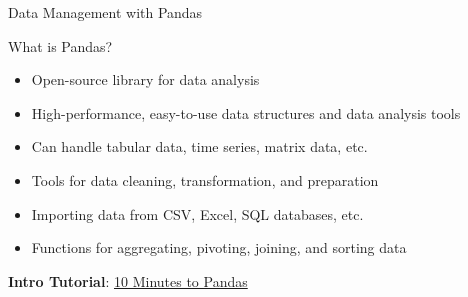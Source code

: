 \documentclass[ignorenonframetext,xcolor=x11names]{beamer}
\begin{document}
\begin{frame}{Data Management with Pandas}
\begin{block}{What is Pandas?}
\begin{itemize}
    \item Open-source library for data analysis
    \item High-performance, easy-to-use data structures and data analysis tools    
    \item Can handle tabular data, time series, matrix data, etc.
    \item Tools for data cleaning, transformation, and preparation    
    \item Importing data from CSV, Excel, SQL databases, etc.    
    \item Functions for aggregating, pivoting, joining, and sorting data
\end{itemize}
\end{block}
\vspace{5mm}
\textbf{Intro Tutorial}: \href{http://pandas.pydata.org/docs/user_guide/10min.html}{10 Minutes to Pandas}
\end{frame}






\end{document}
